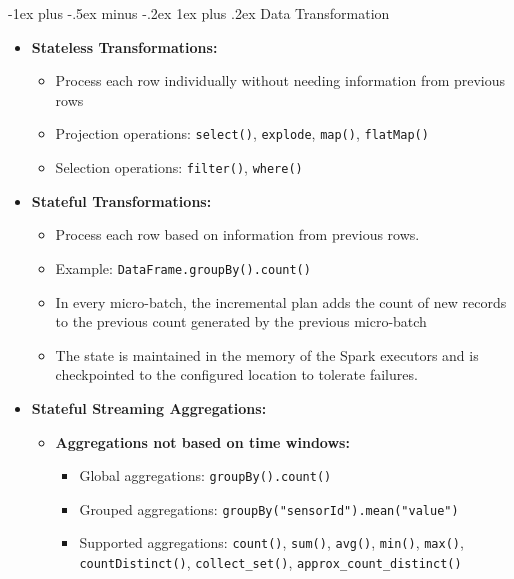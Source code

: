 \documentclass[10pt, landscape]{article}
\makeatletter
\renewcommand{\subsubsection}{\@startsection{subsubsection}{3}{0mm}%
  {-1ex plus -.5ex minus -.2ex}%
  {1ex plus .2ex}%
{\normalfont\small\bfseries}}%
\makeatother
\begin{document}
\begin{multicols*}{4}
  \subsubsection{Data Transformation}
  \begin{itemize}
    \item \textbf{Stateless Transformations:}
        \begin{itemize}
          \item Process each row individually without needing information from previous rows
          \item Projection operations: \texttt{select()}, \texttt{explode}, \texttt{map()}, \texttt{flatMap()}
          \item Selection operations: \texttt{filter()}, \texttt{where()}
        \end{itemize}
    \item \textbf{Stateful Transformations:}
          \begin{itemize}
            \item Process each row based on information from previous rows.
            \item Example: \texttt{DataFrame.groupBy().count()}
            \item In every micro-batch, the incremental plan adds the count of new 
            records to the previous count generated by the previous micro-batch
            \item The state is maintained in the memory of the Spark executors and is 
            checkpointed to the configured location to tolerate failures.
          \end{itemize}
    \item \textbf{Stateful Streaming Aggregations:}
          \begin{itemize}
            \item \textbf{Aggregations not based on time windows:}
            \begin{itemize}
              \item Global aggregations: \texttt{groupBy().count()}
              \item Grouped aggregations: \texttt{groupBy("sensorId").mean("value")}
              \item Supported aggregations: \texttt{count()}, \texttt{sum()}, \texttt{avg()}, \texttt{min()}, \texttt{max()}, \texttt{countDistinct()}, \texttt{collect\_set()}, \texttt{approx\_count\_distinct()}
            \end{itemize}
            

\end{itemize}
\end{itemize}
\end{multicols*}
\end{document}
